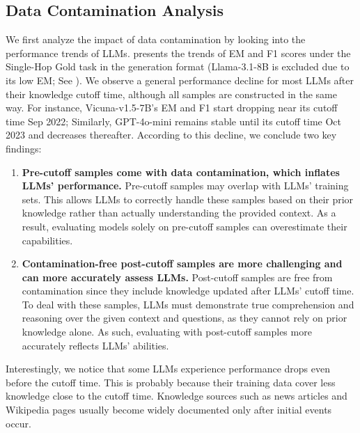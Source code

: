 \documentclass[11pt]{article}
\begin{document}
    \subsection{Data Contamination Analysis} \label{sec_data_contamination}
        We first analyze the impact of data contamination
        by looking into the performance trends of LLMs.
             presents the trends of EM and F1 scores under the Single-Hop Gold task in the generation format
            (Llama-3.1-8B is excluded due to its low EM; See ).
            We observe a general performance decline for most LLMs after their knowledge cutoff time, 
            although all samples are constructed in the same way.
            For instance, Vicuna-v1.5-7B's EM and F1 start dropping near its cutoff time Sep 2022;
            Similarly, GPT-4o-mini remains stable until its cutoff time Oct 2023 and decreases thereafter.
            According to this decline, we conclude two key findings:
            \begin{enumerate}[wide, labelindent=0pt, labelsep=2pt, itemsep=1pt, topsep=1pt, label=\textbf{(\arabic*)}]
                \item
                    \textbf{
                    Pre-cutoff samples come with data contamination, which inflates LLMs' performance.
                    }
                    Pre-cutoff samples may overlap with LLMs' training sets.
                    This allows LLMs to correctly handle these samples based on their prior knowledge rather than actually understanding the provided context.
                    As a result, evaluating models solely on pre-cutoff samples can overestimate their capabilities.
                \item
                    \textbf{Contamination-free post-cutoff samples are more challenging and can more accurately assess LLMs.}
                    Post-cutoff samples are free from contamination since they include knowledge updated after LLMs' cutoff time.
                    To deal with these samples, LLMs must demonstrate true comprehension and reasoning over the given context and questions,
                    as they cannot rely on prior knowledge alone.
                    As such, evaluating with post-cutoff samples more accurately reflects LLMs' abilities.
            \end{enumerate}

            Interestingly, we notice that some LLMs experience performance drops even before the cutoff time.
            This is probably because their training data cover less knowledge close to the cutoff time.
            Knowledge sources such as news articles and Wikipedia pages usually become widely documented only after initial events occur.
\end{document}
